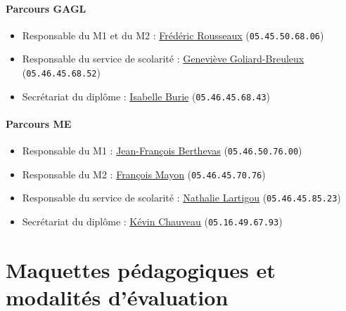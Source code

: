 \documentclass[a4paper,11pt]{article}
\begin{document}
\paragraph{Parcours GAGL}

\begin{itemize}
	\item Responsable du M1 et du M2 : \href{mailto:frederic.rousseaux@univ-lr.fr}{Frédéric Rousseaux} (\texttt{05.45.50.68.06})
	\item Responsable du service de scolarité : \href{mailto:genevieve.breuleux@univ-lr.fr}{Geneviève Goliard-Breuleux} (\texttt{05.46.45.68.52})
	\item Secrétariat du diplôme : \href{mailto:isabelle.burie@univ-lr.fr}{Isabelle Burie} (\texttt{05.46.45.68.43})
\end{itemize}

\paragraph{Parcours ME}

\begin{itemize}
	\item Responsable du M1 : \href{mailto:jean-francois.berthevas@univ-lr.fr}{Jean-François Berthevas} (\texttt{05.46.50.76.00})
	\item Responsable du M2 : \href{mailto:francois.mayon@univ-lr.fr}{François Mayon} (\texttt{05.46.45.70.76})
	\item Responsable du service de scolarité : \href{mailto:nathalie.lartigou}{Nathalie Lartigou} (\texttt{05.46.45.85.23})
	\item Secrétariat du diplôme : \href{mailto:kevin.chauveau}{Kévin Chauveau} (\texttt{05.16.49.67.93})
\end{itemize}

\clearpage

\section{Maquettes pédagogiques et modalités d'évaluation}\label{Maquette}
\end{document}
